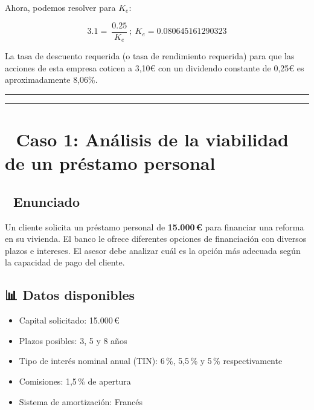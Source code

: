 \documentclass[
  letterpaper,
  DIV=11,
  numbers=noendperiod]{scrreprt}
\providecommand{\tightlist}{%
  \setlength{\itemsep}{0pt}\setlength{\parskip}{0pt}}\usepackage{longtable,booktabs,array}
\begin{document}
\begin{tcolorbox}
\begin{tcolorbox}
Ahora, podemos resolver para \(K_e\):

\[3.1=\:\frac{0.25}{K_e} \:;\:K_e=0.080645161290323\]

La tasa de descuento requerida (o tasa de rendimiento requerida) para
que las acciones de esta empresa coticen a 3,10€ con un dividendo
constante de 0,25€ es aproximadamente 8,06\%.

\end{tcolorbox}

\begin{center}\rule{0.5\linewidth}{0.5pt}\end{center}

\begin{center}\rule{0.5\linewidth}{0.5pt}\end{center}

\section{📁 Caso 1: Análisis de la viabilidad de un préstamo
personal}\label{caso-1-anuxe1lisis-de-la-viabilidad-de-un-pruxe9stamo-personal}

\subsection{🧾 Enunciado}\label{enunciado}

Un cliente solicita un préstamo personal de \textbf{15.000\,€} para
financiar una reforma en su vivienda. El banco le ofrece diferentes
opciones de financiación con diversos plazos e intereses. El asesor debe
analizar cuál es la opción más adecuada según la capacidad de pago del
cliente.

\subsection{📊 Datos disponibles}\label{datos-disponibles}

\begin{itemize}
\tightlist
\item
  Capital solicitado: 15.000\,€
\item
  Plazos posibles: 3, 5 y 8 años
\item
  Tipo de interés nominal anual (TIN): 6\,\%, 5,5\,\% y 5\,\%
  respectivamente
\item
  Comisiones: 1,5\,\% de apertura
\item
  Sistema de amortización: Francés
\end{itemize}


\end{tcolorbox}
\end{document}
